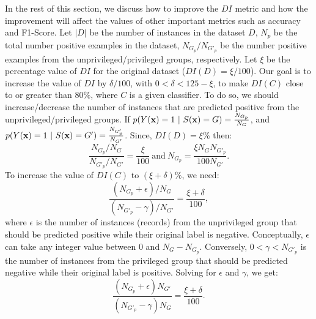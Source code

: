 In the rest of this section, we discuss how to improve the $DI$ metric and how the improvement will affect the values of other important metrics such as accuracy and F1-Score. Let $|D|$ be the number of instances in the dataset $D$, $N_p$ %
be the total number positive examples in the dataset, $N_{G_p}/N_{G'_p}$ %
be the number positive examples from the unprivileged/privileged groups, respectively. Let $\xi$ be the percentage value of $DI$ for the original dataset ($DI(D) = \xi/100$). Our goal is to increase the value of $DI$ by $\delta/100$, with $0 < \delta < 125 - \xi $, to make $DI(C)$ close to or greater than $80\%$, where $C$ is a given classifier. To do so, we should increase/decrease the number of instances that are predicted positive from the unprivileged/privileged groups. If $p(Y({\bf x}) = 1\ |\ S({\bf x}) = G) = \frac{N_{G_p}}{N_G}$, and $p(Y({\bf x}) = 1\ |\ S({\bf x}) = G') = \frac{N_{G'_p}}{N_{G'}}$. 
Since, $DI(D) = \xi\%$ then: 
\begin{equation} \label{eq:NGP}
\frac{N_{G_p}/{N_G}}{N_{G'_p}/{N_{G'}}} = \frac{\xi}{100}\ \text{and}\ N_{G_p} = \frac{\xi N_G N_{G'_p}}{100N_{G'}}.
\end{equation}
To increase the value of $DI(C)$ to $(\xi+\delta)\%$, we need:
\begin{equation}\label{eq:general}
\frac{\left(N_{G_p}+\epsilon\right)/{N_G}}{\left(N_{G'_p}-\gamma\right)/{N_{G'}}} = \frac{\xi+\delta}{100},
\end{equation}
where $\epsilon$ is the number of instances (records) from the unprivileged group that should be predicted positive while their original label is negative. 
Conceptually, $\epsilon$ can take any integer value between $0$ and $N_G - N_{G_p}$.
Conversely, $0 < \gamma < N_{G'_p}$ is the number of instances from the privileged group that should be predicted negative while their original label is positive. 
Solving for $\epsilon$ and $\gamma$, we get:
\begin{equation} \label{eq:compute_eps_gam}
    \frac{\left(N_{G_p}+\epsilon\right){N_{G'}}}{\left(N_{G'_p}-\gamma\right){N_{G}}} = \frac{\xi+\delta}{100}.
\end{equation}

